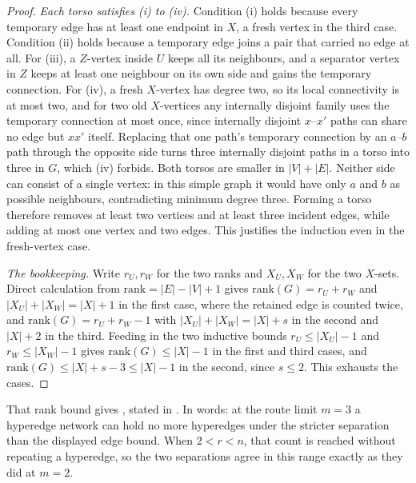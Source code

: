 \begin{proof}
\emph{Each torso satisfies (i) to (iv).} Condition (i) holds because every
temporary edge has at least one endpoint in $X$, a fresh vertex in the third
case. Condition (ii) holds because a temporary edge joins a pair that carried no
edge at all. For (iii), a $Z$-vertex inside $U$ keeps all its neighbours, and a
separator vertex in $Z$ keeps at least one neighbour on its own side and gains
the temporary connection. For (iv), a fresh $X$-vertex has degree two, so its
local connectivity is at most two, and for two old $X$-vertices any internally
disjoint family uses the temporary connection at most once, since internally
disjoint $x$--$x'$ paths can share no edge but $xx'$ itself. Replacing that one
path's temporary connection by an $a$--$b$ path through the opposite side turns
three internally disjoint paths in a torso into three in $G$, which (iv)
forbids. Both torsos are smaller in $|V|+|E|$. Neither side can consist of a single vertex: in this simple graph it would have only $a$ and $b$ as possible neighbours, contradicting minimum degree three. Forming a torso therefore removes at least two vertices and at least three incident edges, while adding at most one vertex and two edges. This justifies the induction even in the fresh-vertex case.

\emph{The bookkeeping.} Write $r_U, r_W$ for the two ranks and $X_U, X_W$ for
the two $X$-sets. Direct calculation from $\mathrm{rank} = |E| - |V| + 1$ gives
$\mathrm{rank}(G) = r_U + r_W$ and $|X_U| + |X_W| = |X| + 1$ in the first case,
where the retained edge is counted twice, and
$\mathrm{rank}(G) = r_U + r_W - 1$ with $|X_U| + |X_W| = |X| + s$ in the second
and $|X| + 2$ in the third. Feeding in the two inductive bounds
$r_U \le |X_U| - 1$ and $r_W \le |X_W| - 1$ gives $\mathrm{rank}(G) \le |X| - 1$
in the first and third cases, and $\mathrm{rank}(G) \le |X| + s - 3 \le |X| - 1$
in the second, since $s \le 2$. This exhausts the cases.
\end{proof}

That rank bound gives , stated in
. In words: at the route limit $m = 3$ a hyperedge network can hold no more hyperedges under the stricter separation than the displayed edge bound. When $2 < r < n$, that count is reached without repeating a hyperedge, so the two separations agree in this range exactly as they did at $m = 2$.

